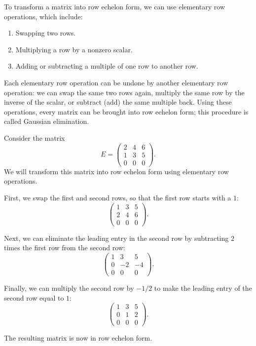 To transform a matrix into row echelon form, we can use elementary row operations, which include:
\begin{enumerate}
    \item Swapping two rows.
    \item Multiplying a row by a nonzero scalar.
    \item Adding or subtracting a multiple of one row to another row.
\end{enumerate}
Each elementary row operation can be undone by another elementary row operation: we can swap the same two rows again, multiply the same row by the inverse of the scalar, or subtract (add) the same multiple back. Using these operations, every matrix can be brought into row echelon form; this procedure is called Gaussian elimination.

\begin{example}
    Consider the matrix
    \[E = \begin{pmatrix}
        2 & 4 & 6 \\
        1 & 3 & 5 \\
        0 & 0 & 0
    \end{pmatrix}.\]
    We will transform this matrix into row echelon form using elementary row operations.

    First, we swap the first and second rows, so that the first row starts with a $1$:
    \[\begin{pmatrix}
        1 & 3 & 5 \\
        2 & 4 & 6 \\
        0 & 0 & 0
    \end{pmatrix}.\]

    Next, we can eliminate the leading entry in the second row by subtracting $2$ times the first row from the second row:
    \[\begin{pmatrix}
        1 & 3 & 5 \\
        0 & -2 & -4 \\
        0 & 0 & 0
    \end{pmatrix}.\]

    Finally, we can multiply the second row by $-1/2$ to make the leading entry of the second row equal to $1$:
    \[\begin{pmatrix}
        1 & 3 & 5 \\
        0 & 1 & 2 \\
        0 & 0 & 0
    \end{pmatrix}.\]

    The resulting matrix is now in row echelon form.
\end{example}

